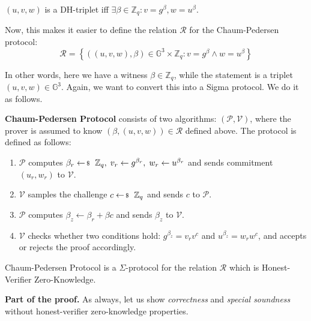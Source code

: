 \documentclass[../../book.tex]{subfiles}
\begin{document}
\begin{proposition}
    $(u,v,w)$ is a DH-triplet iff $\exists \beta \in \mathbb{Z}_q: v = g^{\beta}, w = u^{\beta}$.
\end{proposition}

Now, this makes it easier to define the relation $\mathcal{R}$ for the Chaum-Pedersen protocol:
\begin{equation*}
    \mathcal{R} = \left\{ ((u,v,w), \beta) \in \mathbb{G}^3 \times \mathbb{Z}_q: v = g^{\beta} \wedge w = u^{\beta} \right\}
\end{equation*}

In other words, here we have a witness $\beta \in \mathbb{Z}_q$, while the statement is a triplet $(u,v,w) \in \mathbb{G}^3$. Again, we want to convert this into a Sigma protocol. We do it as follows.

\begin{definition}
    \textbf{Chaum-Pedersen Protocol} consists of two algorithms: $(\mathcal{P}, \mathcal{V})$, where the prover is assumed to know $(\beta,(u,v,w)) \in \mathcal{R}$ defined above. The protocol is defined as follows:
    \begin{enumerate}
        \item $\mathcal{P}$ computes $\beta_r \leftarrowS \mathbb{Z}_q, \; v_r \gets g^{\beta_r}, \; w_r \gets u^{\beta_r}$ and sends commitment $(u_r,w_r)$ to $\mathcal{V}$.
        \item $\mathcal{V}$ samples the challenge $c \leftarrowS \mathbb{Z}_q$ and sends $c$ to $\mathcal{P}$.
        \item $\mathcal{P}$ computes $\beta_z \gets \beta_r + \beta c$ and sends $\beta_z$ to $\mathcal{V}$.
        \item $\mathcal{V}$ checks whether two conditions hold: $g^{\beta_z} = v_rv^c$ and $u^{\beta_z} = w_r w^c$, and accepts or rejects the proof accordingly.
    \end{enumerate}
\end{definition}

\begin{theorem}
    Chaum-Pedersen Protocol is a $\Sigma$-protocol for the relation $\mathcal{R}$ which is Honest-Verifier Zero-Knowledge.
\end{theorem}

\textbf{Part of the proof.} As always, let us show \textit{correctness} and \textit{special soundness} without honest-verifier zero-knowledge properties.
\end{document}
